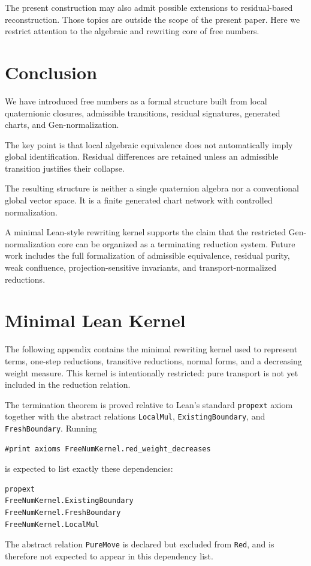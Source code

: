 \documentclass[11pt]{article}
\begin{document}
The present construction may also admit possible extensions to residual-based reconstruction. Those topics are outside the scope of the present paper. Here we restrict attention to the algebraic and rewriting core of free numbers.

\section{Conclusion}

We have introduced free numbers as a formal structure built from local quaternionic closures, admissible transitions, residual signatures, generated charts, and Gen-normalization.

The key point is that local algebraic equivalence does not automatically imply global identification. Residual differences are retained unless an admissible transition justifies their collapse.

The resulting structure is neither a single quaternion algebra nor a conventional global vector space. It is a finite generated chart network with controlled normalization.

A minimal Lean-style rewriting kernel supports the claim that the restricted Gen-normalization core can be organized as a terminating reduction system. Future work includes the full formalization of admissible equivalence, residual purity, weak confluence, projection-sensitive invariants, and transport-normalized reductions.

\appendix
\section{Minimal Lean Kernel}

The following appendix contains the minimal rewriting kernel used to represent terms, one-step reductions, transitive reductions, normal forms, and a decreasing weight measure. This kernel is intentionally restricted: pure transport is not yet included in the reduction relation.

The termination theorem is proved relative to Lean's standard \texttt{propext} axiom together with the abstract relations \texttt{LocalMul}, \texttt{ExistingBoundary}, and \texttt{FreshBoundary}. Running
\begin{lstlisting}[language=Lean]
#print axioms FreeNumKernel.red_weight_decreases
\end{lstlisting}
is expected to list exactly these dependencies:
\begin{lstlisting}[language=Lean]
propext
FreeNumKernel.ExistingBoundary
FreeNumKernel.FreshBoundary
FreeNumKernel.LocalMul
\end{lstlisting}
The abstract relation \texttt{PureMove} is declared but excluded from \texttt{Red}, and is therefore not expected to appear in this dependency list.
\end{document}
